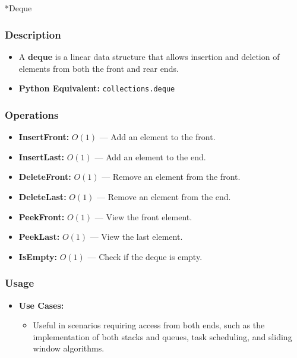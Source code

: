 \documentclass[
  letterpaper,
  DIV=11,
  numbers=noendperiod]{scrreprt}
\makeatletter
\let\oldsubparagraph\subparagraph
\renewcommand{\subparagraph}{
    \@ifstar
      \xxxSubParagraphStar
      \xxxSubParagraphNoStar
  }
\newcommand{\xxxSubParagraphStar}[1]{\oldsubparagraph*{#1}\mbox{}}
\newcommand{\xxxSubParagraphNoStar}[1]{\oldsubparagraph{#1}\mbox{}}
\providecommand{\tightlist}{%
  \setlength{\itemsep}{0pt}\setlength{\parskip}{0pt}}
\makeatother
\begin{document}
\subparagraph*{Deque}\label{deque}

\subsubsection{Description}

\begin{itemize}
\tightlist
\item
  A \textbf{deque} is a linear data structure that allows insertion and
  deletion of elements from both the front and rear ends.
\item
  \textbf{Python Equivalent:} \texttt{collections.deque}
\end{itemize}

\subsubsection{Operations}

\begin{itemize}
\tightlist
\item
  \textbf{InsertFront:} \(O(1)\) --- Add an element to the front.
\item
  \textbf{InsertLast:} \(O(1)\) --- Add an element to the end.
\item
  \textbf{DeleteFront:} \(O(1)\) --- Remove an element from the front.
\item
  \textbf{DeleteLast:} \(O(1)\) --- Remove an element from the end.
\item
  \textbf{PeekFront:} \(O(1)\) --- View the front element.
\item
  \textbf{PeekLast:} \(O(1)\) --- View the last element.
\item
  \textbf{IsEmpty:} \(O(1)\) --- Check if the deque is empty.
\end{itemize}

\subsubsection{Usage}

\begin{itemize}
\item
  \textbf{Use Cases:}

  \begin{itemize}
  \tightlist
  \item
    Useful in scenarios requiring access from both ends, such as the
    implementation of both stacks and queues, task scheduling, and
    sliding window algorithms.
  \end{itemize}
\end{itemize}
\end{document}
